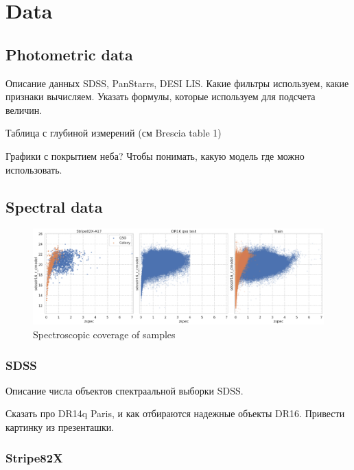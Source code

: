 \section{Data}\label{sec:data}

\subsection{Photometric data}

Описание данных SDSS, PanStarrs, DESI LIS. Какие фильтры используем, какие признаки вычисляем. Указать формулы, которые используем для подсчета величин.

Таблица с глубиной измерений (см Brescia table 1)

Графики с покрытием неба? Чтобы понимать, какую модель где можно использовать.


\subsection{Spectral data}

\begin{figure}
    \centering
    \includegraphics[width=\linewidth]{images/spectroscopic-coverage.png}
    \caption{Spectroscopic coverage of samples}
    \label{fig:spectroscopic_coverage}
\end{figure}

\subsubsection{SDSS}

Описание числа объектов спектраальной выборки SDSS.

Сказать про DR14q Paris, и как отбираются надежные объекты DR16. Привести картинку из презенташки.

\subsubsection{Stripe82X}

